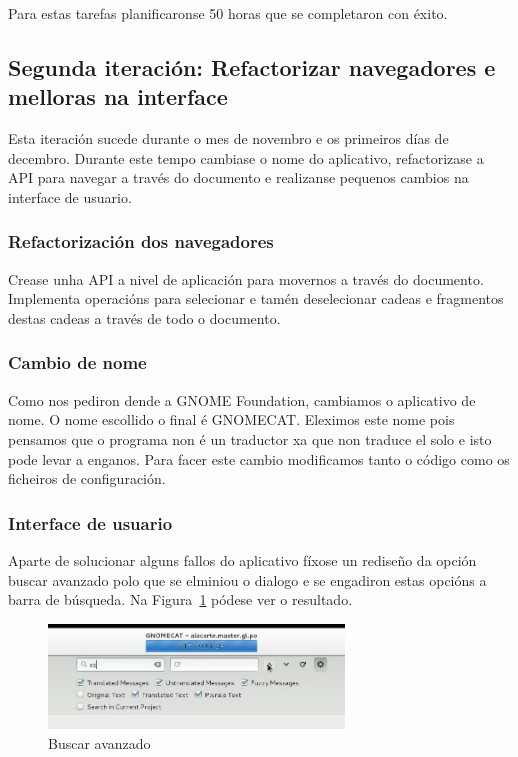 Para estas tarefas planificaronse 50 horas que se completaron con éxito.

\subsection{Segunda iteración: Refactorizar navegadores e melloras na interface}
Esta iteración sucede durante o mes de novembro e os primeiros días de decembro. Durante este tempo cambiase o nome do aplicativo, refactorizase a API para navegar a través do documento e realizanse pequenos cambios na interface de usuario.

\subsubsection{Refactorización dos navegadores}
Crease unha API a nivel de aplicación para movernos a través do documento. Implementa operacións para selecionar e tamén deselecionar cadeas e fragmentos destas cadeas a través de todo o documento.

\subsubsection{Cambio de nome}
Como nos pediron dende a GNOME Foundation, cambiamos o aplicativo de nome. O nome escollido o final é GNOMECAT. Eleximos este nome pois pensamos que o programa non é un traductor xa que non traduce el solo e isto pode levar a enganos. Para facer este cambio modificamos tanto o código como os ficheiros de configuración.

\subsubsection{Interface de usuario}
Aparte de solucionar alguns fallos do aplicativo fíxose un rediseño da opción buscar avanzado polo que se elminiou o dialogo e se engadiron estas opcións a barra de búsqueda. Na Figura~\ref{fig:curso2014_it2_search} pódese ver o resultado.

\begin{figure}[h!]
    \centering
    \includegraphics[width=0.7\textwidth]{img/curso2014_it2_search.png} 
    \caption{Buscar avanzado}
    \label{fig:curso2014_it2_search}
\end{figure}

